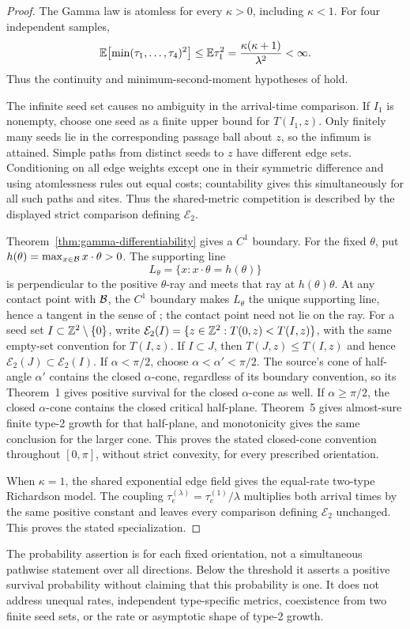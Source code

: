 \begin{proof}
The Gamma law is atomless for every $\kappa>0$, including $\kappa<1$.
For four independent samples,
\[
 \mathbb E\bigl[\min(\tau_1,\ldots,\tau_4)^2\bigr]
 \le \mathbb E\tau_1^2
 =\frac{\kappa(\kappa+1)}{\lambda^2}<\infty.
\]
Thus the continuity and minimum-second-moment hypotheses of
\cite[Theorem~1]{ADS2026} hold.

The infinite seed set causes no ambiguity in the arrival-time comparison.
If $I_1$ is nonempty, choose one seed as a finite upper bound for
$T(I_1,z)$. Only finitely many seeds lie in the corresponding passage
ball about $z$, so the infimum is attained. Simple paths from distinct
seeds to $z$ have different edge sets. Conditioning on all edge weights
except one in their symmetric difference and using atomlessness rules
out equal costs;
countability gives this simultaneously for all such paths and sites.
Thus the shared-metric competition is described by the displayed strict
comparison defining $\mathcal E_2$.

Theorem~\ref{thm:gamma-differentiability} gives a $C^1$ boundary.
For the fixed $\theta$, put
$h(\theta)=\max_{x\in\mathcal B}x\cdot\theta>0$. The supporting line
\[
 L_\theta=\{x:x\cdot\theta=h(\theta)\}
\]
is perpendicular to the positive $\theta$-ray and meets that ray at
$h(\theta)\theta$. At any contact point with $\mathcal B$, the $C^1$ boundary
makes $L_\theta$ the unique supporting line, hence a tangent in the
sense of \cite{ADS2026}; the contact point need not lie on the ray.
For a seed set $I\subset\mathbb Z^2\setminus\{0\}$, write
$\mathcal E_2(I)=\{z\in\mathbb Z^2:T(0,z)<T(I,z)\}$, with the same
empty-set convention for $T(I,z)$. If $I\subset J$, then
$T(J,z)\le T(I,z)$ and hence
$\mathcal E_2(J)\subset\mathcal E_2(I)$. If $\alpha<\pi/2$, choose
$\alpha<\alpha'<\pi/2$. The source's cone of half-angle $\alpha'$
contains the closed $\alpha$-cone, regardless of its boundary convention,
so its Theorem~1 gives positive survival for the closed $\alpha$-cone
as well. If
$\alpha\ge\pi/2$, the closed $\alpha$-cone contains the closed critical
half-plane. Theorem~5 gives almost-sure finite type-2 growth for that
half-plane, and monotonicity gives the same conclusion for the larger
cone. This proves the stated closed-cone convention throughout
$[0,\pi]$, without strict convexity, for every prescribed orientation.

When $\kappa=1$, the shared exponential edge field gives the equal-rate
two-type Richardson model. The coupling
$\tau_e^{(\lambda)}=\tau_e^{(1)}/\lambda$ multiplies both arrival
times by the same positive constant and leaves every comparison
defining $\mathcal E_2$ unchanged. This proves the stated specialization.
\end{proof}

The probability assertion is for each fixed orientation, not a simultaneous
pathwise statement over all directions. Below the threshold it asserts a
positive survival probability without claiming that this probability is one.
It does not address unequal rates, independent type-specific metrics,
coexistence from two finite seed sets, or the rate or asymptotic shape of
type-2 growth.
